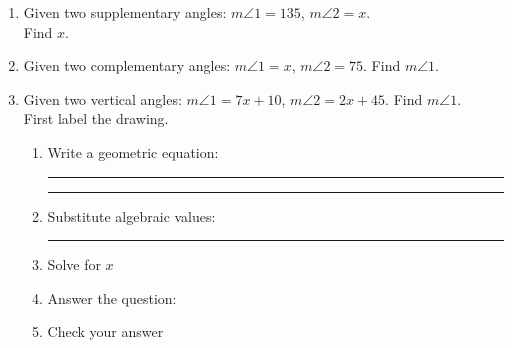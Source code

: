 \documentclass[12pt, oneside]{article}
\begin{document}
\begin{enumerate}
  \newpage
            \item Given two supplementary angles: $m \angle 1 = 135$, $m \angle 2 = x$.\\ Find $x$. \vspace{2cm}
            \item Given two complementary angles: $m \angle 1 = x$, $m \angle 2 = 75$. Find $m \angle 1$. \vspace{2cm}

            \item Given two vertical angles: $m \angle 1 = 7x+10$, $m \angle 2 = 2x+45$. Find $m \angle 1$.\\
            First label the drawing.
            \begin{flushright}
            \end{flushright}
            \begin{enumerate}
              \item Write a geometric equation: \rule{4cm}{0.15mm} \hspace{1cm} \rule{4cm}{0.15mm}
              \vspace{.7cm}
              \item Substitute algebraic values: \rule{4cm}{0.15mm}
              \item Solve for $x$
              \vspace{2cm}
              \item Answer the question:
              \vspace{2cm}
              \item Check your answer
            \end{enumerate}

  \end{enumerate}
\end{document}
